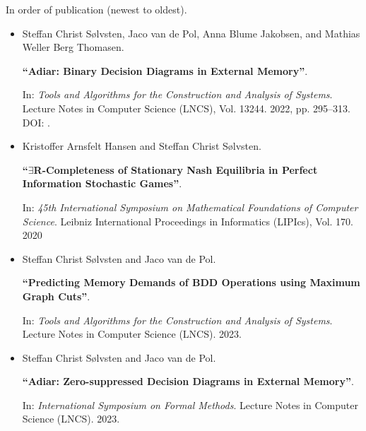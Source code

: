 \newpage
\begin{fullwidth}
  In order of publication (newest to oldest).

  \divider


  \begin{itemize}
  \normalsize

  \item Steffan Christ Sølvsten, Jaco van de Pol, Anna Blume Jakobsen, and Mathias Weller Berg Thomasen.

        {\bf ``Adiar: Binary Decision Diagrams in External Memory''}.

        In: \emph{Tools and Algorithms for the Construction and Analysis of
        Systems}. Lecture Notes in Computer Science (LNCS), Vol. 13244. 2022,
        pp. 295--313.
        DOI: .

        \divider

  \item Kristoffer Arnsfelt Hansen and Steffan Christ Sølvsten.

        {\bf ``$\exists$R-Completeness of Stationary Nash Equilibria in Perfect
        Information Stochastic Games''}.

        In: \emph{45th International Symposium on Mathematical Foundations of
        Computer Science}. Leibniz International Proceedings in Informatics
        (LIPIcs), Vol. 170. 2020

  \end{itemize}

  \divider


  \begin{itemize}
  \normalsize

  \item Steffan Christ Sølvsten and Jaco van de Pol.

        {\bf ``Predicting Memory Demands of BDD Operations using Maximum Graph
        Cuts''}.

        In: \emph{Tools and Algorithms for the Construction and Analysis of
        Systems}. Lecture Notes in Computer Science (LNCS). 2023.

        \divider

  \item Steffan Christ Sølvsten and Jaco van de Pol.

        {\bf ``Adiar: Zero-suppressed Decision Diagrams in External Memory''}.

        In: \emph{International Symposium on Formal Methods}. Lecture Notes in
        Computer Science (LNCS). 2023.

  \end{itemize}


\end{fullwidth}

